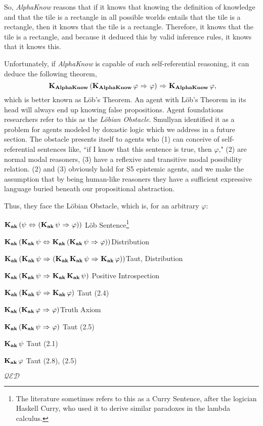 So, \emph{AlphaKnow} reasons that if it knows that knowing the definition of knowledge and that the tile is a rectangle in all possible worlds entails that the tile is a rectangle, then it knows that the tile is a rectangle. Therefore, it knows that the tile is a rectangle, and because it deduced this by valid inference rules, it knows that it knows this.

Unfortunately, if \emph{AlphaKnow} is capable of such self-referential reasoning, it can deduce the following theorem, 
\begin{equation}~\label{alpha_know}
	\mathbf{K}_{\mathbf{AlphaKnow}}\,(\mathbf{K}_{\mathbf{AlphaKnow}}\,\varphi {\ \Rightarrow \ } \varphi) {\ \Rightarrow \ } \mathbf{K}_{\mathbf{AlphaKnow}}\,\varphi,
\end{equation} 
which is better known as L\"ob's Theorem. An agent with L\"ob's Theorem in its head will always end up knowing false propositions. Agent foundations researchers refer to this as the \emph{L\"obian Obstacle}. Smullyan identified it as a problem for agents modeled by doxastic logic which we address in a future section. The obstacle presents itself to agents who (1) can conceive of self-referential sentences like, ``if I know that this sentence is true, then $\varphi$," (2) are normal modal reasoners, (3) have a reflexive and transitive modal possibility relation. (2) and (3) obviously hold for S5 epistemic agents, and we make the assumption that by being human-like reasoners they have a sufficient expressive language buried beneath our propositional abstraction.

Thus, they face the L\"obian Obstacle, which is, for an arbitrary $\varphi$:
\begin{center}
	\begin{proofenum}
        \item $\mathbf{K}_{\mathbf{ak}}\,(\psi {\ \Leftrightarrow \ } (\mathbf{K}_{\mathbf{ak}}\,\psi {\ \Rightarrow \ } \varphi))$ \mbox{}\hfill L\"ob Sentence\footnote{The literature sometimes refers to this as a Curry Sentence, after the logician Haskell Curry, who used it to derive similar paradoxes in the lambda calculus.}
        \item $\mathbf{K}_{\mathbf{ak}}\,(\mathbf{K}_{\mathbf{ak}}\,\psi {\ \Leftrightarrow \ } \mathbf{K}_{\mathbf{ak}}\,(\mathbf{K}_{\mathbf{ak}}\,\psi {\ \Rightarrow \ } \varphi))$\mbox{}\hfill  Distribution
        \item $\mathbf{K}_{\mathbf{ak}}\,(\mathbf{K}_{\mathbf{ak}}\,\psi {\ \Rightarrow \ } (\mathbf{K}_{\mathbf{ak}}\,\mathbf{K}_{\mathbf{ak}}\,\psi {\ \Rightarrow \ } \mathbf{K}_{\mathbf{ak}}\,\varphi))$\mbox{}\hfill  Taut, Distribution
        \item $\mathbf{K}_{\mathbf{ak}}\,(\mathbf{K}_{\mathbf{ak}}\,\psi {\ \Rightarrow \ } \mathbf{K}_{\mathbf{ak}}\,\mathbf{K}_{\mathbf{ak}}\,\psi)$ \mbox{}\hfill  Positive Introspection
        \item $\mathbf{K}_{\mathbf{ak}}\,(\mathbf{K}_{\mathbf{ak}}\,\psi {\ \Rightarrow \ } \mathbf{K}_{\mathbf{ak}}\,\varphi)$ \mbox{}\hfill  Taut (2.4)
        \item $\mathbf{K}_{\mathbf{ak}}\,(\mathbf{K}_{\mathbf{ak}}\,\varphi {\ \Rightarrow \ } \varphi)$\mbox{}\hfill  Truth Axiom
        \item $\mathbf{K}_{\mathbf{ak}}\,(\mathbf{K}_{\mathbf{ak}}\,\psi{\ \Rightarrow \ } \varphi)$ \mbox{}\hfill  Taut (2.5)
        \item $\mathbf{K}_{\mathbf{ak}}\,\psi$ \mbox{}\hfill Taut (2.1)
        \item $\mathbf{K}_{\mathbf{ak}}\,\varphi$ \mbox{}\hfill Taut (2.8), (2.5)
    \end{proofenum}\flushright$\mathcal{QED}$
    \end{center}



